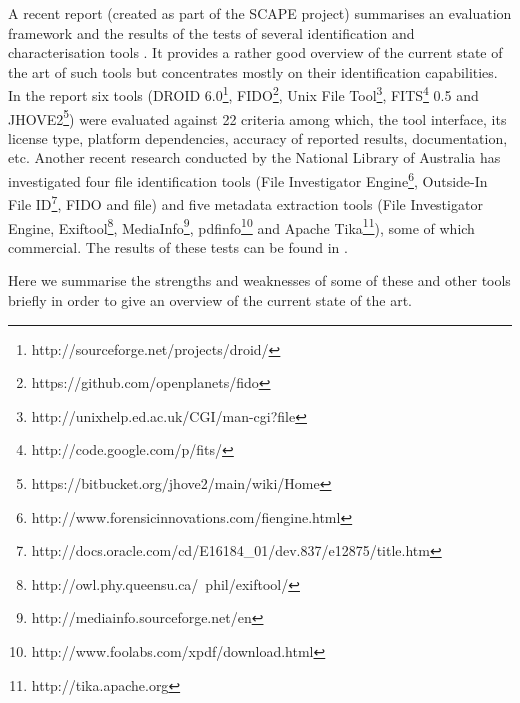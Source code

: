 A recent report (created as part of the SCAPE project) summarises an evaluation framework and the results of the tests of several identification and characterisation tools \cite{Knijff:2011it}. It provides a rather good overview of the current state of the art of such tools but concentrates mostly on their identification capabilities. In the report six tools (DROID 6.0\footnote{http://sourceforge.net/projects/droid/}, FIDO\footnote{https://github.com/openplanets/fido}, Unix File Tool\footnote{http://unixhelp.ed.ac.uk/CGI/man-cgi?file}, FITS\footnote{http://code.google.com/p/fits/} 0.5 and JHOVE2\footnote{https://bitbucket.org/jhove2/main/wiki/Home}) were evaluated against 22 criteria among which, the tool interface, its license type, platform dependencies, accuracy of reported results, documentation, etc. Another recent research conducted by the National Library of Australia has investigated four file identification tools (File Investigator Engine\footnote{http://www.forensicinnovations.com/fiengine.html}, Outside-In File ID\footnote{http://docs.oracle.com/cd/E16184\_01/dev.837/e12875/title.htm}, FIDO and file) and five metadata extraction tools (File Investigator Engine, Exiftool\footnote{http://owl.phy.queensu.ca/~phil/exiftool/}, MediaInfo\footnote{http://mediainfo.sourceforge.net/en}, pdfinfo\footnote{http://www.foolabs.com/xpdf/download.html} and Apache Tika\footnote{http://tika.apache.org}), some of which commercial. The results of these tests can be found in \cite{NLASP2452}.

Here we summarise the strengths and weaknesses of some of these and other tools briefly in order to give an overview of the current state of the art.

